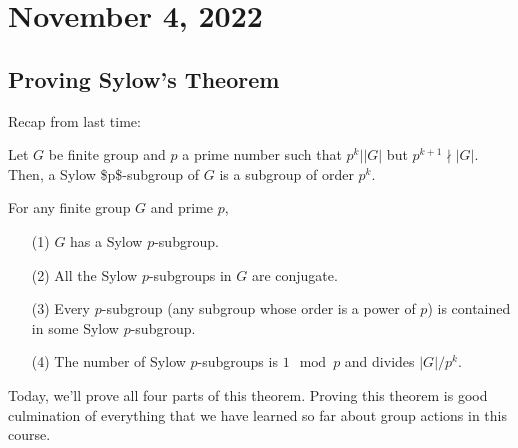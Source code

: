 \section{November 4, 2022}

\subsection{Proving Sylow's Theorem}

Recap from last time:

\begin{definition}

Let $G$ be finite group and $p$ a prime number such that $p^k\mid \vert G\vert$ but $p^{k+1}\nmid \vert G\vert$. Then, a \ac{Sylow $p$-subgroup} of $G$ is a subgroup of order $p^k$.

\end{definition}

\begin{theorem}

For any finite group $G$ and prime $p$, 
\begin{enumerate}
    \item [(1)] $G$ has a Sylow $p$-subgroup.
    \item [(2)] All the Sylow $p$-subgroups in $G$ are conjugate.
    \item [(3)] Every $p$-subgroup (any subgroup whose order is a power of $p$) is contained in some Sylow $p$-subgroup. 
    \item [(4)] The number of Sylow $p$-subgroups is $1\mod{p}$ and divides $\vert G\vert / p^k$.
\end{enumerate}
\end{theorem}

Today, we'll prove all four parts of this theorem. Proving this theorem is good culmination of everything that we have learned so far about group actions in this course.

